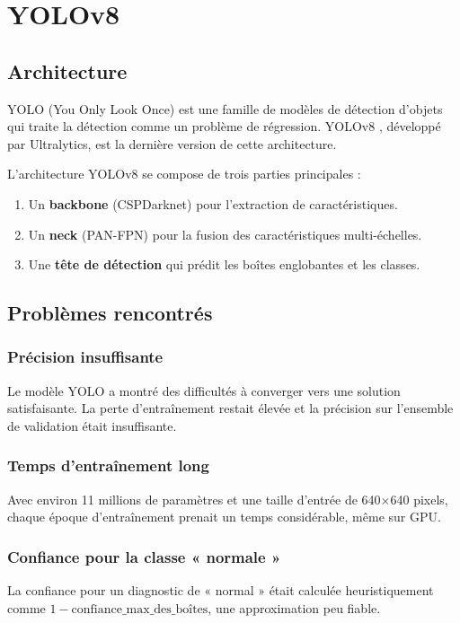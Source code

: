 \documentclass[12pt,a4paper,twoside]{report}
\begin{document}
\section{YOLOv8}

\subsection{Architecture}

YOLO (You Only Look Once) \cite{yolo} est une famille de modèles de détection d'objets qui traite la détection comme un problème de régression. YOLOv8 \cite{ultralytics}, développé par Ultralytics, est la dernière version de cette architecture.

L'architecture YOLOv8 se compose de trois parties principales :
\begin{enumerate}
  \item Un \textbf{backbone} (CSPDarknet) pour l'extraction de caractéristiques.
  \item Un \textbf{neck} (PAN-FPN) pour la fusion des caractéristiques multi-échelles.
  \item Une \textbf{tête de détection} qui prédit les boîtes englobantes et les classes.
\end{enumerate}

\subsection{Problèmes rencontrés}

\subsubsection{Précision insuffisante}
Le modèle YOLO a montré des difficultés à converger vers une solution satisfaisante. La perte d'entraînement restait élevée et la précision sur l'ensemble de validation était insuffisante.

\subsubsection{Temps d'entraînement long}
Avec environ 11 millions de paramètres et une taille d'entrée de 640$\times$640 pixels, chaque époque d'entraînement prenait un temps considérable, même sur GPU.

\subsubsection{Confiance pour la classe « normale »}
La confiance pour un diagnostic de « normal » était calculée heuristiquement comme $1 - \text{confiance\_max\_des\_boîtes}$, une approximation peu fiable.
\end{document}
